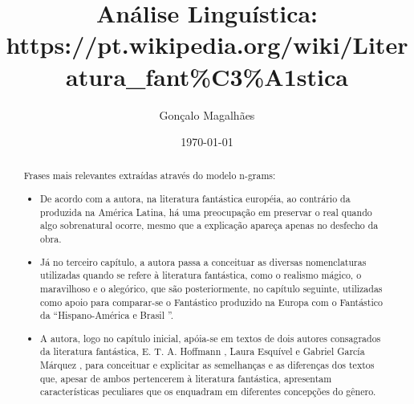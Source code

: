\documentclass{article}
\title{Análise Linguística: https://pt.wikipedia.org/wiki/Literatura\_fant\%C3\%A1stica}
\author{Gonçalo Magalhães}
\date{\today}
\begin{document}
\maketitle

\begin{abstract}
Frases mais relevantes extraídas através do modelo n-grams:
\begin{itemize}
\item De acordo com a autora, na literatura fantástica européia, ao contrário da produzida na América Latina, há uma preocupação em preservar o real quando algo sobrenatural ocorre, mesmo que a explicação apareça apenas no desfecho da obra.
\item Já no terceiro capítulo, a autora passa a conceituar as diversas nomenclaturas utilizadas quando se refere à literatura fantástica, como o realismo mágico, o maravilhoso e o alegórico, que são posteriormente, no capítulo seguinte, utilizadas como apoio para comparar-se o Fantástico produzido na Europa com o Fantástico da “Hispano-América e Brasil ”.
\item A autora, logo no capítulo inicial, apóia-se em textos de dois autores consagrados da literatura fantástica, E. T. A. Hoffmann , Laura Esquível e Gabriel García Márquez , para conceituar e explicitar as semelhanças e as diferenças dos textos que, apesar de ambos pertencerem à literatura fantástica, apresentam características peculiares que os enquadram em diferentes concepções do gênero.
\end{itemize}
\end{abstract}
\end{document}
